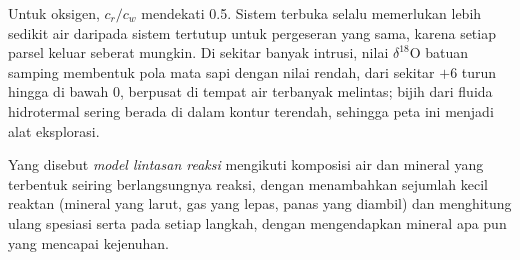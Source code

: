Untuk oksigen, $c_r/c_w$ mendekati 0.5. Sistem terbuka selalu memerlukan
lebih sedikit air daripada sistem tertutup untuk pergeseran yang sama, karena setiap parsel keluar
seberat mungkin. Di sekitar banyak intrusi, nilai $\delta^{18}\mathrm O$ batuan
samping membentuk pola mata sapi dengan nilai rendah, dari sekitar $+6$ turun hingga di bawah
0, berpusat di tempat air terbanyak melintas; bijih dari fluida hidrotermal
sering berada di dalam kontur terendah, sehingga peta ini menjadi
alat eksplorasi.

\begin{omfigure}

\par{}\label{fig:b3:water-rock-interaction:box}
\end{omfigure}

\begin{definition}\label{def:b3:water-rock-interaction:reaction-path}
Yang disebut \emph{model lintasan reaksi} mengikuti
komposisi air dan mineral yang terbentuk seiring berlangsungnya reaksi,
dengan menambahkan sejumlah kecil reaktan (mineral yang larut, gas yang lepas,
panas yang diambil) dan menghitung ulang spesiasi serta  pada
setiap langkah, dengan mengendapkan mineral apa pun yang mencapai kejenuhan.
\end{definition}

